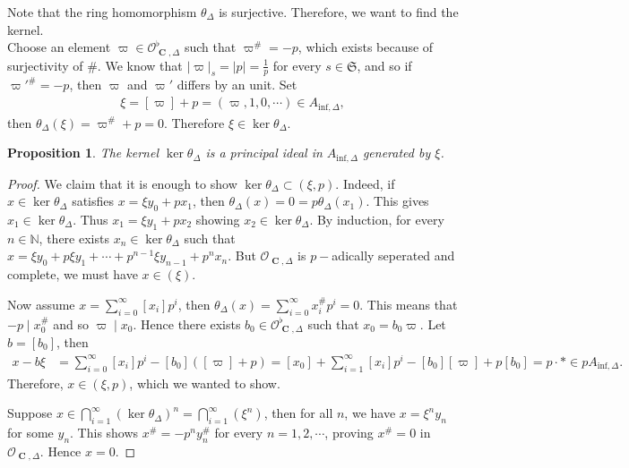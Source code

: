 \documentclass{amsart}
\newtheorem{proposition}{Proposition}[section]
\newcommand{\mAinf}{A_{\mathrm{inf},\Delta}}
\DeclareMathOperator{\C}{\textbf{C}}
\begin{document}
Note that the ring homomorphism $\theta_\Delta$ is surjective. Therefore, we want to find the kernel.\\

Choose an element $\varpi\in \mathcal{O}^\flat_{\C,\Delta}$ such that $\varpi^\#=-p$, which exists because of surjectivity of $\#$. We know that $|\varpi|_s=|p|=\frac{1}{p}$ for every $s\in \mathfrak{S}$, and so if $\varpi'^\#=-p$, then $\varpi$ and $\varpi'$ differs by an unit. Set 
\begin{align*}
    \xi=[\varpi]+p=(\varpi,1,0,\cdots)\in\mAinf,
\end{align*}
then $\theta_\Delta(\xi)=\varpi^\#+p=0$. Therefore $\xi\in\ker\theta_\Delta$.

\begin{proposition}
    The kernel $\ker\theta_\Delta$ is a principal ideal in $\mAinf$ generated by $\xi$.
\end{proposition}

\begin{proof}
    We claim that it is enough to show $\ker\theta_\Delta\subset(\xi,p)$. Indeed, if $x\in\ker\theta_\Delta$ satisfies $x=\xi y_0+px_1$, then $\theta_\Delta(x)=0=p\theta_\Delta(x_1)$. This gives $x_1\in\ker\theta_\Delta$. Thus $x_1=\xi y_1+px_2$ showing $x_2\in\ker\theta_\Delta$. By induction, for every $n\in\mathbb{N}$, there exists $x_n\in\ker\theta_\Delta$ such that $x=\xi y_0+p\xi y_1+\cdots+p^{n-1}\xi y_{n-1}+p^n x_n$. But $\mathcal{O}_{\C,\Delta}$ is $p-$adically seperated and complete, we must have $x\in (\xi)$.

    Now assume $x=\sum\limits_{i=0}^\infty [x_i]p^i$, then $\theta_\Delta(x)=\sum\limits_{i=0}^\infty x^\#_ip^i=0$. This means that $-p\mid x^\#_0$ and so $\varpi\mid x_0$. Hence there exists $b_0\in\mathcal{O}^\flat_{\C,\Delta}$ such that $x_0=b_0\varpi$. Let $b=[b_0]$, then 
    \begin{align*}
        x-b\xi&=\sum\limits_{i=0}^\infty [x_i]p^i-[b_0]([\varpi]+p)
              =[x_0]+\sum\limits_{i=1}^\infty[x_i]p^i-[b_0][\varpi]+p[b_0]
              =p\cdot *\in p\mAinf.
    \end{align*}
    Therefore, $x\in (\xi,p)$, which we wanted to show.

    Suppose $x\in \bigcap\limits_{i=1}^\infty(\ker\theta_\Delta)^n=\bigcap\limits_{i=1}^\infty(\xi^n)$, then for all $n$, we have $x=\xi^n y_n$ for some $y_n$. This shows $x^\#=-p^ny^\#_n$ for every $n=1,2,\cdots$, proving $x^\#=0$ in $\mathcal{O}_{\C,\Delta}$. Hence $x=0$.
\end{proof}
\end{document}
